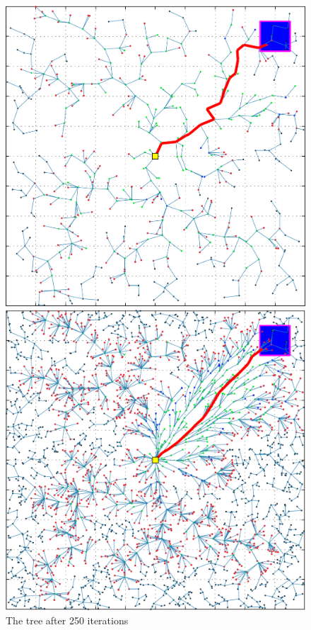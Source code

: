 \documentclass[conference]{IEEEtran}
\begin{document}
\begin{figure}[h]
\centering
\begin{minipage}[t]{0.3\linewidth}
\centering
\includegraphics[width=1\textwidth]{images/RRT/ARSLAN/01_v.png}
\caption{The tree after 250 iterations}
\end{minipage}
\hfill
\begin{minipage}[t]{0.3\linewidth}
\centering
\includegraphics[width=1\textwidth]{images/RRT/ARSLAN/02_v.png}

\end{minipage}
\end{figure}
\end{document}
